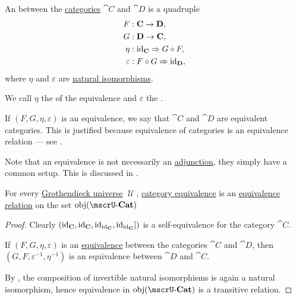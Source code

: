 \begin{definition}\label{def:category_equivalence}
  An  between the \hyperref[def:category]{categories} \( \cat{C} \) and \( \cat{D} \) is a quadruple
  \begin{equation}\label{eq:def:category_equivalence/signature}
    \begin{aligned}
                F &: \cat{C} \to \cat{D}, \\
                G &: \cat{D} \to \cat{C}, \\
             \eta &: \id_{\cat{C}} \Rightarrow G \bincirc F, \\
      \varepsilon &: F \bincirc G \Rightarrow \id_{\cat{D}},
    \end{aligned}
  \end{equation}
  where \( \eta \) and \( \varepsilon \) are \hyperref[thm:natural_isomorphism]{natural isomorphisms}.

  We call \( \eta \) the  of the equivalence and \( \varepsilon \) the .

  If \( (F, G, \eta, \varepsilon) \) is an equivalence, we say that \( \cat{C} \) and \( \cat{D} \) are equivalent categories. This is justified because equivalence of categories is an equivalence relation --- see .

  Note that an equivalence is not necessarily an \hyperref[def:category_adjunction]{adjunction}, they simply have a common setup. This is discussed in .
\end{definition}

\begin{proposition}\label{thm:category_equivalence_is_equivalence_relation}
  For every \hyperref[def:grothendieck_universe]{Grothendieck universe} \( \mscrU \), \hyperref[def:category_equivalence]{category equivalence} is an \hyperref[def:equivalence_relation]{equivalence relation} on the set \( \obj(\ucat{Cat}) \)
\end{proposition}
\begin{proof}
   Clearly \( (\operatorname{id}_{\operatorname{\mathbf{C}}}, \operatorname{id}_{\operatorname{\mathbf{C}}}, \operatorname{id}_{\operatorname{id}_{\operatorname{\mathbf{C}}}}, \operatorname{id}_{\operatorname{id}_{\operatorname{\mathbf{C}}}}]) \) is a self-equivalence for the category \( \cat{C} \).

   If \( (F, G, \eta, \varepsilon) \) is an \hyperref[def:category_equivalence]{equivalence} between the categories \( \cat{C} \) and \( \cat{D} \), then \( (G, F, \varepsilon^{-1}, \eta^{-1}) \) is an equivalence between \( \cat{D} \) and \( \cat{C} \).

   By , the composition of invertible natural isomorphisms is again a natural isomorphism, hence equivalence in \( \obj(\ucat{Cat}) \) is a transitive relation.
\end{proof}

